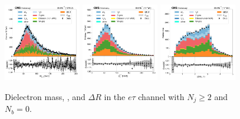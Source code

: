 \begin{figure}[htb!]
    \centering
    \includegraphics[width=0.3\textwidth]{chapters/Analysis/sectionPlots/figures/data_mc_overlays/etau_2016_cat_gt2_eq0_signal_linear_lepton_dilepton1_mass}
    \includegraphics[width=0.3\textwidth]{chapters/Analysis/sectionPlots/figures/data_mc_overlays/etau_2016_cat_gt2_eq0_signal_linear_lepton_dilepton1_pt}
    \includegraphics[width=0.3\textwidth]{chapters/Analysis/sectionPlots/figures/data_mc_overlays/etau_2016_cat_gt2_eq0_signal_linear_lepton_dilepton1_delta_r}
    \caption{Dielectron mass, \pt, and $\Delta R$ in the $e\tau$ channel
    with $N_{j} \geq 2$ and $N_{b} = 0$.}
    \label{fig:analysis:plots:etau_4_dilepton}
\end{figure}

